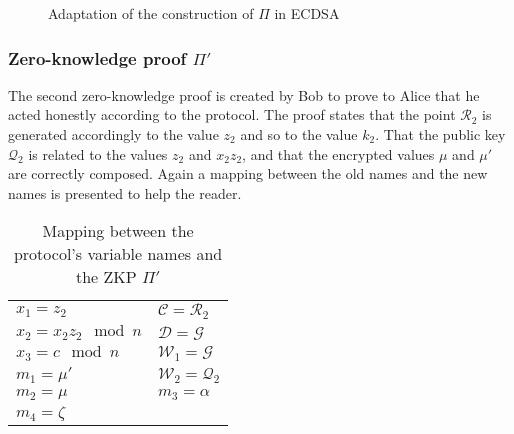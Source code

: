 \begin{figure}[h]
  \caption{Adaptation of the construction of $\Pi$ in ECDSA}
  \label{fig:adaptationOfPi}
\end{figure}

\subsubsection{Zero-knowledge proof $\Pi'$}

The second zero-knowledge proof is created by Bob to prove to Alice that he
acted honestly according to the protocol. The proof states that the point
$\mathcal{R}_2$ is generated accordingly to the value $z_2$ and so to the value
$k_2$. That the public key $\mathcal{Q}_2$ is related to the values $z_2$ and
$x_2z_2$, and that the encrypted values $\mu$ and $\mu'$ are correctly composed.
Again a mapping between the old names and the new names is presented to help the
reader.

\begin{table}[h]
  \begin{tabular}{p{4cm} l}
    $x_1 = z_2$ & $\mathcal{C} = \mathcal{R}_2$ \\
    $x_2 = x_2z_2 \mod n$ & $\mathcal{D} = \mathcal{G}$ \\
    $x_3 = c \mod n$ & $\mathcal{W}_1 = \mathcal{G}$ \\
    $m_1 = \mu'$ & $\mathcal{W}_2 = \mathcal{Q}_2$ \\
    $m_2 = \mu$ & $m_3 = \alpha$ \\
    $m_4 = \zeta$ &
  \end{tabular}
  \caption{Mapping between the protocol's variable names and the ZKP $\Pi'$}
  \label{fig:mappingOfVarNamesPi2}
\end{table}

